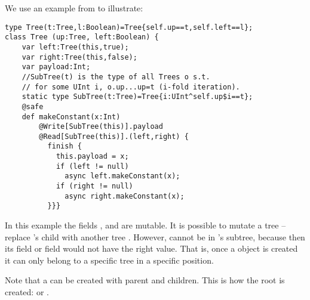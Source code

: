 




We use an example from \cite{DPJ} to illustrate:
  \begin{lstlisting}
type Tree(t:Tree,l:Boolean)=Tree{self.up==t,self.left==l};
class Tree (up:Tree, left:Boolean) {
    var left:Tree(this,true);
    var right:Tree(this,false);
    var payload:Int;
    //SubTree(t) is the type of all Trees o s.t.
    // for some UInt i, o.up...up=t (i-fold iteration).
    static type SubTree(t:Tree)=Tree{i:UInt^self.up$i==t};
    @safe
    def makeConstant(x:Int)
        @Write[SubTree(this)].payload
        @Read[SubTree(this)].(left,right) {
          finish {
            this.payload = x;
            if (left != null)
              async left.makeConstant(x);
            if (right != null)
              async right.makeConstant(x);
          }}}
  \end{lstlisting}
In this example the fields , and 
are mutable. It is possible to mutate a tree  -- replace
's  child with another tree . However,  cannot be in
's  subtree, because then its  field or
 field would not have the right value. That is, once a
 object is created it can only belong to a specific tree in
a specific position.

Note that a  can be created with  parent and
children. This is how the root is created:
 or .

